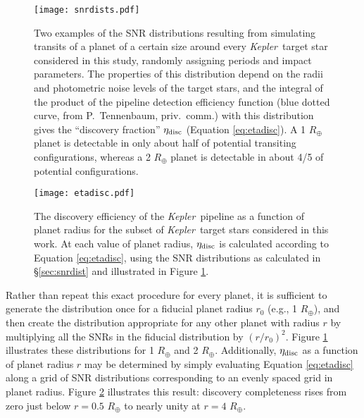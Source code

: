 \documentclass[iop]{emulateapj}
\def\Kepler{\textit{Kepler}}
\def\Rearth{R_\oplus}
\begin{document}
\begin{figure}[t!]
   \centering
   \texttt{[image: snrdists.pdf]} %
   \caption{Two examples of the SNR distributions resulting from simulating transits of a planet of a certain size around every \Kepler\ target star considered in this study, randomly assigning periods and impact parameters.  The properties of this distribution depend on the radii and photometric noise levels of the target stars, and the integral of the product of the pipeline detection efficiency function (blue dotted curve, from P.~Tennenbaum, priv.~comm.) with this distribution  gives the ``discovery fraction'' $\eta_{\rm disc}$ (Equation \ref{eq:etadisc}).  A 1 $R_\oplus$ planet is detectable in only about half of potential transiting configurations, whereas a 2 $R_\oplus$ planet is detectable in about 4/5 of potential configurations.}
   \label{fig:snrdists}
\end{figure}

\begin{figure}[t!]
   \centering
   \texttt{[image: etadisc.pdf]} %
   \caption{The discovery efficiency of the \Kepler\ pipeline as a function of planet radius for the subset of \Kepler\ target stars considered in this work.  At each value of planet radius, $\eta_{\rm disc}$ is calculated according to Equation \ref{eq:etadisc}, using the SNR distributions as calculated in \S\ref{sec:snrdist} and illustrated in Figure \ref{fig:snrdists}.}
   \label{fig:etadisc}
\end{figure}


Rather than repeat this exact procedure for every planet, it is sufficient to generate the distribution once for a fiducial planet radius $r_0$ (e.g., 1 $R_\oplus$), and then create the distribution appropriate for any other planet with radius $r$ by multiplying all the SNRs in the fiducial distribution by $(r/r_0)^2$.  Figure \ref{fig:snrdists} illustrates these distributions for 1 $R_\oplus$ and 2 $R_\oplus$.  Additionally, $\eta_{\rm disc}$ as a function of planet radius $r$ may be determined by simply evaluating Equation \ref{eq:etadisc} along a grid of SNR distributions corresponding to an evenly spaced grid in planet radius.  Figure \ref{fig:etadisc} illustrates this result: discovery completeness rises from zero just below $r = 0.5$ $R_\oplus$ to nearly unity at $r = 4$ $\Rearth$.  
\end{document}
